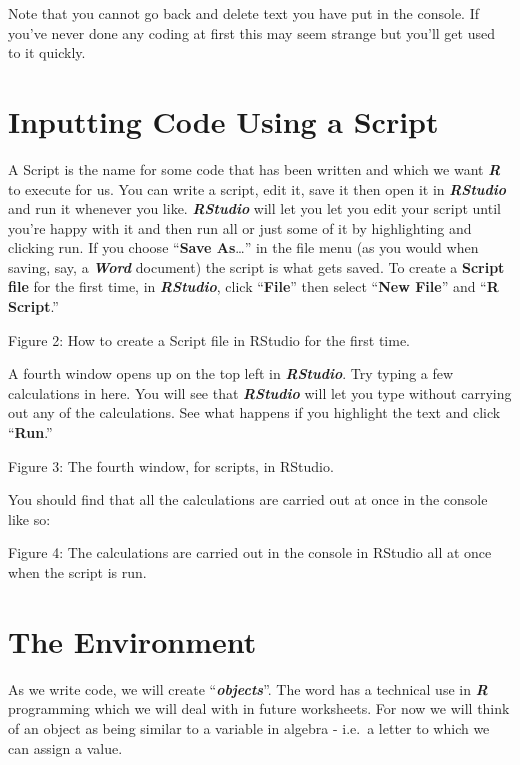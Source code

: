 \documentclass[
]{book}
\begin{document}
Note that you cannot go back and delete text you have put in the console. If you've never done any coding at first this may seem strange but you'll get used to it quickly.

\section{Inputting Code Using a Script}\label{inputting-code-using-a-script}

A Script is the name for some code that has been written and which we want \textbf{\emph{R}} to execute for us. You can write a script, edit it, save it then open it in \textbf{\emph{RStudio}} and run it whenever you like. \textbf{\emph{RStudio}} will let you let you edit your script until you're happy with it and then run all or just some of it by highlighting and clicking run. If you choose ``\textbf{Save As}\ldots{}'' in the file menu (as you would when saving, say, a \textbf{\emph{Word}} document) the script is what gets saved. To create a \textbf{Script file} for the first time, in \textbf{\emph{RStudio}}, click ``\textbf{File}'' then select ``\textbf{New File}'' and ``\textbf{R Script}.''

Figure 2: How to create a Script file in RStudio for the first time.

A fourth window opens up on the top left in \textbf{\emph{RStudio}}. Try typing a few calculations in here. You will see that \textbf{\emph{RStudio}} will let you type without carrying out any of the calculations. See what happens if you highlight the text and click ``\textbf{Run}.''

Figure 3: The fourth window, for scripts, in RStudio.

You should find that all the calculations are carried out at once in the console like so:

Figure 4: The calculations are carried out in the console in RStudio all at once when the script is run.

\section{The Environment}\label{the-environment}

As we write code, we will create ``\textbf{\emph{objects}}''. The word has a technical use in \textbf{\emph{R}} programming which we will deal with in future worksheets. For now we will think of an object as being similar to a variable in algebra - i.e.~a letter to which we can assign a value.
\end{document}
